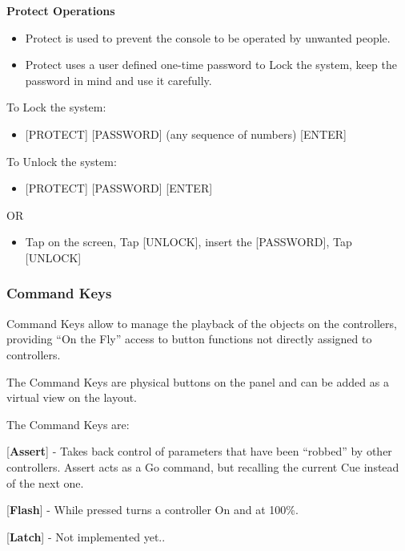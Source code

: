 \documentclass[
]{article}
\providecommand{\tightlist}{%
  \setlength{\itemsep}{0pt}\setlength{\parskip}{0pt}}
\begin{document}
\textbf{Protect Operations}

\begin{itemize}
\item
  Protect is used to prevent the console to be operated by unwanted people.
\item
  Protect uses a user defined one-time password to Lock the system, keep the password in mind and use it carefully.
\end{itemize}

To Lock the system:

\begin{itemize}
\tightlist
\item
  {[}PROTECT{]} {[}PASSWORD{]} (any sequence of numbers) {[}ENTER{]}
\end{itemize}

To Unlock the system:

\begin{itemize}
\tightlist
\item
  {[}PROTECT{]} {[}PASSWORD{]} {[}ENTER{]}
\end{itemize}

OR

\begin{itemize}
\tightlist
\item
  Tap on the screen, Tap {[}UNLOCK{]}, insert the {[}PASSWORD{]}, Tap {[}UNLOCK{]}
\end{itemize}

\hypertarget{command-keys}{%
\subsubsection{Command Keys}\label{command-keys}}

Command Keys allow to manage the playback of the objects on the controllers, providing ``On the Fly'' access to button functions not directly assigned to controllers.

The Command Keys are physical buttons on the panel and can be added as a virtual view on the layout.

The Command Keys are:

{[}\textbf{Assert}{]} - Takes back control of parameters that have been ``robbed'' by other controllers. Assert acts as a Go command, but recalling the current Cue instead of the next one.

{[}\textbf{Flash}{]} - While pressed turns a controller On and at 100\%.

{[}\textbf{Latch}{]} - {Not implemented yet.}.
\end{document}
